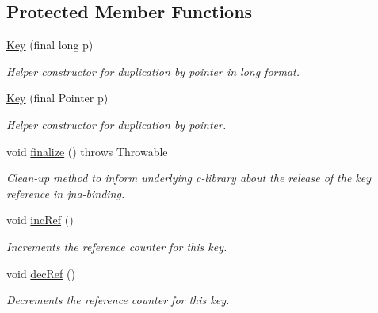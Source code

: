 \subsection*{Protected Member Functions}
\begin{DoxyCompactItemize}
\item 
\mbox{\hyperlink{classorg_1_1libelektra_1_1Key_aeae5ed8b5eb0e9e4b7fce9ef9817fdfa}{Key}} (final long p)
\begin{DoxyCompactList}\small\item\em Helper constructor for duplication by pointer in long format. \end{DoxyCompactList}\item 
\mbox{\hyperlink{classorg_1_1libelektra_1_1Key_af40497ff85d172136ed1f274a50d37e7}{Key}} (final Pointer p)
\begin{DoxyCompactList}\small\item\em Helper constructor for duplication by pointer. \end{DoxyCompactList}\item 
\mbox{\label{classorg_1_1libelektra_1_1Key_a1ae26aab95214a90a90bbcdeae828f7f}} 
void \mbox{\hyperlink{classorg_1_1libelektra_1_1Key_a1ae26aab95214a90a90bbcdeae828f7f}{finalize}} ()  throws Throwable 	
\begin{DoxyCompactList}\small\item\em Clean-\/up method to inform underlying c-\/library about the release of the key reference in jna-\/binding. \end{DoxyCompactList}\item 
\mbox{\label{classorg_1_1libelektra_1_1Key_a83a2c9059ea97153731bcce1a68fc3b4}} 
void \mbox{\hyperlink{classorg_1_1libelektra_1_1Key_a83a2c9059ea97153731bcce1a68fc3b4}{inc\+Ref}} ()
\begin{DoxyCompactList}\small\item\em Increments the reference counter for this key. \end{DoxyCompactList}\item 
\mbox{\label{classorg_1_1libelektra_1_1Key_a62e237b332ecaa64790f9487edff0bdb}} 
void \mbox{\hyperlink{classorg_1_1libelektra_1_1Key_a62e237b332ecaa64790f9487edff0bdb}{dec\+Ref}} ()
\begin{DoxyCompactList}\small\item\em Decrements the reference counter for this key. \end{DoxyCompactList}\end{DoxyCompactItemize}

